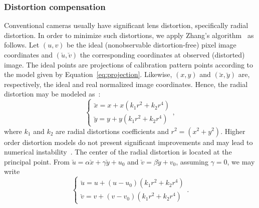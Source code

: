 \subsubsection{Distortion compensation}\label{sec:Zhang}
%
Conventional cameras usually have significant lens distortion, specifically radial distortion.
In order to minimize such distortions, we apply Zhang's algorithm~\cite{Zhang2000a} as follows.
%
Let $(u,v)$ be the ideal (nonobservable distortion-free) pixel image coordinates and
$(\breve{u},\breve{v})$ the corresponding coordinates at observed (distorted) image.
The ideal points are projections of calibration pattern points according to the model given by Equation~\eqref{eq:projection}.
Likewise, $(x,y)$ and $(\breve{x},\breve{y})$ are, respectively, the ideal and real normalized image coordinates.
Hence, the radial distortion may be modeled as~\cite{Zhang2000a}:
%
\begin{equation}
  \begin{cases}
    \breve{x} = x + x(k_1 r^2 + k_2 r^4) \\%
    \breve{y} = y + y(k_1 r^2 + k_2 r^4) %
   \end{cases},
\end{equation}
%
where $k_1$ and $k_2$ are radial distortions coefficients and $r^2 = (x^2 + y^2)$.
Higher order distortion models do not present significant improvements and may lead to numerical instability~\cite{Zhang2000a}.
The center of the radial distortion is located at the principal point.
From
$\breve{u} = \alpha \breve{x} + \gamma \breve{y} + u_0 $ and $\breve{v} = \beta \breve{y} + v_0$, assuming $\gamma = 0$,
we may write
%
\begin{equation}
\begin{cases}
  \breve{u} = u + (u-u_0)(k_1 r^2 + k_2 r^4 ) \\
  \breve{v} = v + (v-v_0)(k_1 r^2 + k_2 r^4 )
\end{cases}.
\label{eq:u_dist}
\end{equation}

